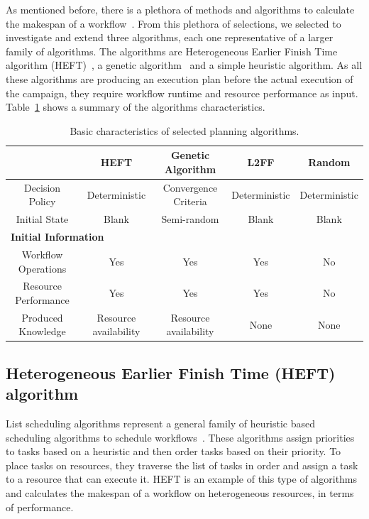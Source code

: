As mentioned before, there is a plethora of methods and algorithms to calculate the makespan of a workflow~\cite{lu2019review}.
From this plethora of selections, we selected to investigate and extend three algorithms, each one representative of a larger family of algorithms.
The algorithms are Heterogeneous Earlier Finish Time algorithm (HEFT)~\cite{topcuoglu2002performance}, a genetic algorithm~\cite{page2005algorithm} and a simple heuristic algorithm.
As all these algorithms are producing an execution plan before the actual execution of the campaign, they require workflow runtime and resource performance as input.
Table~\ref{tab:sched_algo} shows a summary of the algorithms characteristics.

\begin{table}[t]
    \centering
    \scriptsize
    \begin{tabular}{@{}ccccc@{}}
        \toprule
        &\textbf{HEFT}     &\textbf{Genetic Algorithm} &\textbf{L2FF} & \textbf{Random} \\
        \midrule
        Decision Policy   &Deterministic &Convergence Criteria &Deterministic& Deterministic\\
        Initial State    &Blank &Semi-random &Blank & Blank\\
        \midrule
        \multicolumn{5}{l}{\textbf{Initial Information}}\\\midrule
        Workflow Operations &Yes & Yes & Yes & No\\
        Resource Performance &Yes &Yes &Yes & No\\
        \midrule
        Produced Knowledge& Resource availability& Resource availability&None&None\\
        \bottomrule
    \end{tabular}
    \caption{Basic characteristics of selected planning algorithms.\label{tab:sched_algo}}
\end{table}

\subsection{Heterogeneous Earlier Finish Time (HEFT) algorithm}
\label{algo:heft}
List scheduling algorithms represent a general family of heuristic based scheduling algorithms to schedule workflows~\cite{dong2006scheduling,list_sched_wiki}. 
These algorithms assign priorities to tasks based on a heuristic and then order tasks based on their priority.
To place tasks on resources, they traverse the list of tasks in order and assign a task to a resource that can execute it.
HEFT is an example of this type of algorithms~\cite{dong2006scheduling} and calculates the makespan of a workflow on heterogeneous resources, in terms of performance.

